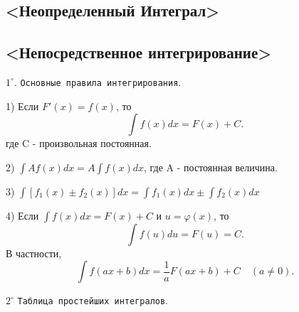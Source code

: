 \documentclass[12pt]{article}
\begin{document}
	\tableofcontents\newpage
	
\begin{center}
\section[<Неопределенный интеграл>]{<Неопределенный Интеграл>}
\end{center}
	
\subsection[<Непосредственное интегрирование>]{<Непосредственное интегрирование>}

$1^{\circ}$. {\tt Основные правила интегрирования}.

1) Если $F'(x) = f(x)$, то
\[
	\int f(x) dx = F(x) +C.
\]
где C - произвольная постоянная.

2) $\int Af(x)dx = A\int f(x)dx$, где A - постоянная величина.

3) $\int [f_1(x)\pm f_2(x)]dx = \int f_1(x)dx \pm \int f_2(x)dx$

\label{rl:4}4) Если $\int f(x)dx = F(x) +C$ и $u=\varphi(x)$, то
\[
	\int f(u)du = F(u) =C.
\]	
В частности,
\[
	\int f(ax+b)dx = \dfrac{1}{a}F(ax+b) + C \quad (a\neq0).
\]

$2^{\circ}$ {\tt Таблица простейших интегралов}.
\end{document}
